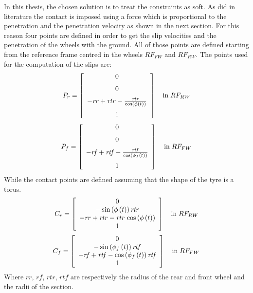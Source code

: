 In this thesis, the chosen solution is to treat the constraints as soft. As did in literature \cite{leonelli2019optimal} the contact is imposed using a force which is proportional to the penetration and the penetration velocity as shown in the next section. For this reason four points are defined in order to get the slip velocities and the penetration of the wheels with the ground. All of those points are defined starting from the reference frame centred in the wheels $RF_{FW}$ and $RF_{RW}$.
The points used for the computation of the slips are:
%
\begin{equation}
P_r =   \left[ \begin {array}{c} 0\\ \noalign{\medskip}0\\ \noalign{\medskip}
-{\it rr}+{\it rtr}-{\frac {{\it rtr}}{\cos \left( \phi \left( t
 \right)  \right) }}\\ \noalign{\medskip}1\end {array} \right] 
\quad \text{in} \; RF_{RW}
\end{equation}
%
\begin{equation}
P_f =   \left[ \begin {array}{c} 0\\ \noalign{\medskip}0\\ \noalign{\medskip}
-{\it rf}+{\it rtf}-{\frac {{\it rtf}}{\cos \left( \phi_{f} \left( t
 \right)  \right) }}\\ \noalign{\medskip}1\end {array} \right]
\quad \text{in} \; RF_{FW}
\end{equation}
%
While the contact points are defined assuming that the shape of the tyre is a torus. 
%
\begin{equation}
C_r =  \left[ \begin {array}{c} 0\\ 
-\sin \left( \phi
\left( t \right)  \right) {\it rtr}\\ 
-{\it rr}+{
\it rtr}-{\it rtr}\,\cos \left( \phi \left( t \right)  \right)\\ 
1\end {array} \right] 
\quad \text{in} \; RF_{RW}
\end{equation}
%
\begin{equation}
C_f =  \left[ \begin {array}{c} 0\\ 
-\sin \left( \phi_{f}
\left( t \right)  \right) {\it rtf}\\ 
-{\it rf}+{
\it rtf}-\cos \left( \phi_{f} \left( t \right)  \right) {\it rtf}\\
1\end {array} \right] 
\quad \text{in} \; RF_{FW}
\end{equation}
%
Where $rr$, $rf$, $rtr$, $rtf$ are respectively the radius of the rear and front wheel and the radii of the section.
%

